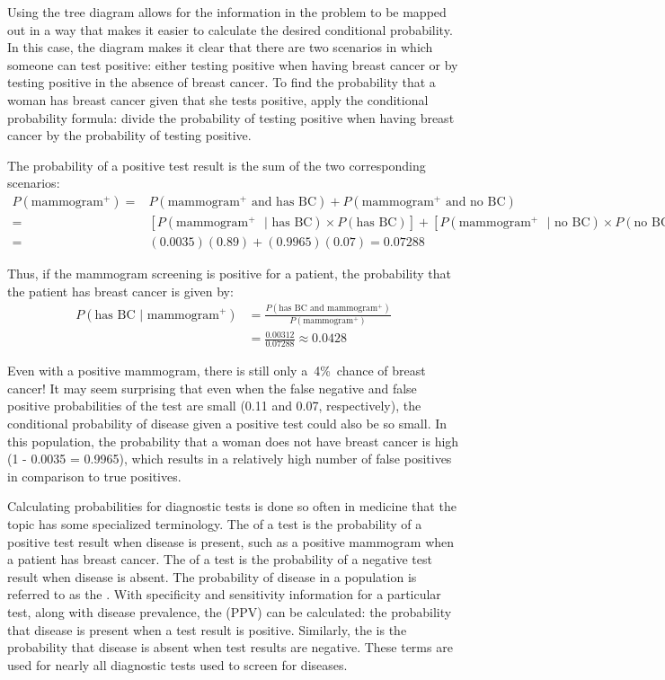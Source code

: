 Using the tree diagram allows for the information in the problem to be mapped out in a way that makes it easier to calculate the desired conditional probability. In this case, the diagram makes it clear that there are two scenarios in which someone can test positive: either testing positive when having breast cancer or by testing positive in the absence of breast cancer. To find the probability that a woman has breast cancer given that she tests positive, apply the conditional probability formula: divide the probability of testing positive when having breast cancer by the probability of testing positive.

The probability of a positive test result is the sum of the two corresponding scenarios:
\begin{align*}
P(\text{mammogram$^+$}) =&  P(\text{mammogram$^+$ and has BC}) + P(\text{mammogram$^+$ and no BC}) \\
=&[P(\text{mammogram$^+$ } | \text{ has BC}) \times P(\text{has BC})] + [P(\text{mammogram$^+$ } | \text{ no BC}) \times P(\text{no BC})] \\
=& (0.0035)(0.89) + (0.9965)(0.07) = 0.07288
\end{align*}

Thus, if the mammogram screening is positive for a patient, the probability that the patient has breast cancer is given by: 
\begin{align*}
P(\text{has BC } | \text{ mammogram$^+$})
	&= \frac{P(\text{has BC and mammogram$^+$})}{P(\text{mammogram$^+$})}\\
	&= \frac{0.00312}{0.07288} \approx 0.0428
\end{align*}

Even with a positive mammogram, there is still only a~4\%~chance of breast cancer! It may seem surprising that even when the false negative and false positive probabilities of the test are small (0.11 and 0.07, respectively), the conditional probability of disease given a positive test could also be so small. In this population, the probability that a woman does not have breast cancer is high (1 - 0.0035 = 0.9965), which results in a relatively high number of false positives in comparison to true positives.

Calculating probabilities for diagnostic tests is done so often in medicine that the topic has some specialized terminology. The  of a test is the probability of a positive test result when disease is present, such as a positive mammogram when a patient has breast cancer. The  of a test is the probability of a negative test result when disease is absent. The probability of disease in a population is referred to as the . With specificity and sensitivity information for a particular test, along with disease prevalence, the  (PPV) can be calculated: the probability that disease is present when a test result is positive. Similarly, the  is the probability that disease is absent when test results are negative. These terms are used for nearly all diagnostic tests used to screen for diseases.

